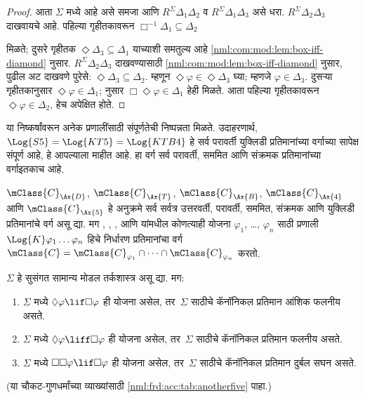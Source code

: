 \begin{proof}
  आता $\Sigma$ मध्ये  आहे
  असे समजा आणि $R^\Sigma
  \Delta_1\Delta_2$ व
  $R^\Sigma \Delta_1\Delta_3$
  असे धरा. $R^\Sigma
  \Delta_2\Delta_3$ दाखवायचे आहे.
  पहिल्या गृहीतकावरून
  $\Box^{-1}\Delta_1 \subseteq \Delta_2$

  मिळते; दुसरे गृहीतक
  $\Diamond\Delta_3 \subseteq \Delta_1$
  याच्याशी समतुल्य आहे
  \ref{nml:com:mod:lem:box-iff-diamond} नुसार.
  $R^\Sigma \Delta_2\Delta_3$
  दाखवण्यासाठी
    \ref{nml:com:mod:lem:box-iff-diamond} नुसार,
    पुढील अट दाखवणे पुरेसे:
  $\Diamond\Delta_3 \subseteq \Delta_2$.
  म्हणून $\Diamond\varphi \in
  \Diamond\Delta_3$ घ्या;
  म्हणजे $\varphi \in \Delta_3$.
  दुसऱ्या गृहीतकानुसार
  $\Diamond\varphi \in \Delta_1$;
   नुसार
  $\Box\Diamond\varphi \in \Delta_1$
  हेही मिळते. आता पहिल्या
  गृहीतकावरून $\Diamond\varphi \in
  \Delta_2$, हेच अपेक्षित होते.
  \end{proof}

या निष्कर्षांवरून अनेक प्रणालींसाठी
संपूर्णतेची निष्पन्नता मिळते.
उदाहरणार्थ, $\Log{S5} = \Log{KT5} =
\Log{KTB4}$ हे सर्व परावर्ती युक्लिडी
प्रतिमानांच्या वर्गाच्या सापेक्ष संपूर्ण
आहे, हे आपल्याला माहीत आहे.
हा वर्ग सर्व परावर्ती, सममित आणि
संक्रमक प्रतिमानांच्या वर्गाइतकाच आहे.

\begin{thm}\label{nml:com:fra:thm:generaldet}
  $\mClass{C}_\Ax{D}$,
  $\mClass{C}_\Ax{T}$,
  $\mClass{C}_\Ax{B}$,
  $\mClass{C}_\Ax{4}$ आणि
  $\mClass{C}_\Ax{5}$
  हे अनुक्रमे सर्व सर्वत्र उत्तरवर्ती,
  परावर्ती, सममित, संक्रमक आणि
  युक्लिडी प्रतिमानांचे वर्ग असू द्या.
  मग , , ,
   आणि  यांमधील
  कोणत्याही योजना $\varphi_1$, \dots, $\varphi_n$
  साठी प्रणाली
  $\Log{K}\varphi_1 \dots \varphi_n$
  हिचे निर्धारण प्रतिमानांचा वर्ग
  $\mClass{C} = \mClass{C}_{\varphi_1} \cap \dots
  \cap \mClass{C}_{\varphi_n}$ करतो.
\end{thm}

\begin{prop}
  $\Sigma$ हे सुसंगत सामान्य मोडल तर्कशास्त्र
  असू द्या. मग:
  \begin{enumerate}
  \item\label{nml:com:fra:prop:anotherfive-a}
    $\Sigma$ मध्ये $\Diamond\varphi \lif \Box
    \varphi$ ही योजना असेल, तर~$\Sigma$
    साठीचे कॅनॉनिकल प्रतिमान
    आंशिक फलनीय असते.
  \item $\Sigma$ मध्ये
    $\Diamond\varphi \liff \Box
    \varphi$ ही योजना असेल, तर~$\Sigma$
    साठीचे कॅनॉनिकल प्रतिमान
    फलनीय असते.
  \item $\Sigma$ मध्ये
    $\Box\Box\varphi \lif \Box
    \varphi$ ही योजना असेल, तर~$\Sigma$
    साठीचे कॅनॉनिकल प्रतिमान
    दुर्बल सघन असते.
  \end{enumerate}
  (या चौकट-गुणधर्मांच्या व्याख्यांसाठी
  \ref{nml:frd:acc:tab:anotherfive} पाहा.)
\end{prop}

